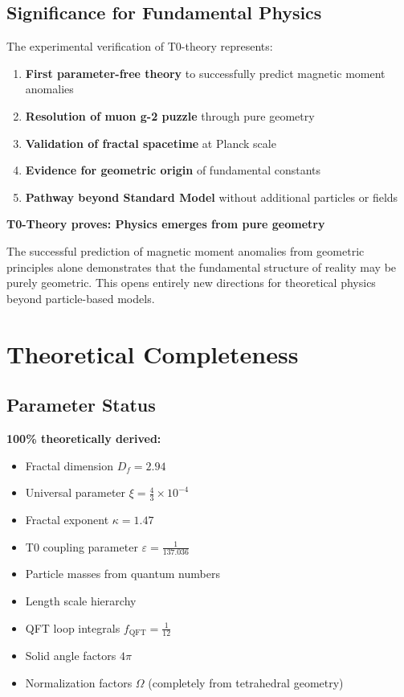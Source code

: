 \documentclass[12pt,a4paper]{article}
\numberwithin{equation}{section}
\newcommand{\xipar}{\xi}
\newcommand{\epsilonT}{\varepsilon}
\newcommand{\fQFT}{f_{\text{QFT}}}
\newcommand{\kappaT}{\kappa}
\newcommand{\Df}{D_f}
\newcommand{\Omegafactor}{\Omega}
\begin{document}
	
	\subsection{Significance for Fundamental Physics}
	
	The experimental verification of T0-theory represents:
	
	\begin{enumerate}
		\item \textbf{First parameter-free theory} to successfully predict magnetic moment anomalies
		\item \textbf{Resolution of muon g-2 puzzle} through pure geometry
		\item \textbf{Validation of fractal spacetime} at Planck scale
		\item \textbf{Evidence for geometric origin} of fundamental constants
		\item \textbf{Pathway beyond Standard Model} without additional particles or fields
	\end{enumerate}
	
	\begin{tcolorbox}[title={\textbf{REVOLUTIONARY IMPACT}},colframe=purple,colback=purple!5]
		\textbf{T0-Theory proves: Physics emerges from pure geometry}
		
		The successful prediction of magnetic moment anomalies from geometric principles alone demonstrates that the fundamental structure of reality may be purely geometric. This opens entirely new directions for theoretical physics beyond particle-based models.
	\end{tcolorbox}
	
	\section{Theoretical Completeness}
	
	\subsection{Parameter Status}
	
	\textbf{100\% theoretically derived:}
	\begin{itemize}
		\item Fractal dimension $\Df = 2.94$
		\item Universal parameter $\xipar = \frac{4}{3} \times 10^{-4}$
		\item Fractal exponent $\kappaT = 1.47$
		\item T0 coupling parameter $\epsilonT = \frac{1}{137.036}$
		\item Particle masses from quantum numbers
		\item Length scale hierarchy
		\item QFT loop integrals $\fQFT = \frac{1}{12}$
		\item Solid angle factors $4\pi$
		\item Normalization factors $\Omegafactor$ (completely from tetrahedral geometry)
	\end{itemize}
	
\end{document}
